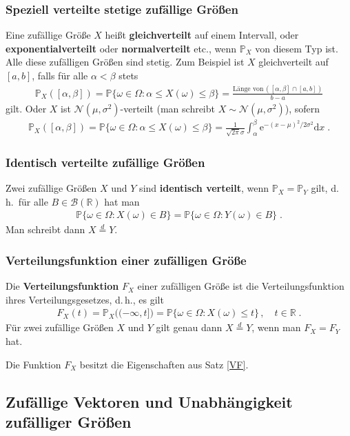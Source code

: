 \documentclass[ngerman,draft,parskip=half,twoside]{scrartcl}
\newcommand*{\R}{\mathbb{R}}      %
\newcommand*{\BorelM}{\mathcal{B}}  %
\newcommand*{\WKM}{\mathbb{P}}      %
\begin{document}
\subsubsection{Speziell verteilte stetige zufällige Größen}
Eine zufällige Größe $X$ heißt \textbf{gleichverteilt} auf einem Intervall,
oder \textbf{exponentialverteilt} oder \textbf{normalverteilt} etc., wenn $\WKM_X$ von diesem Typ
ist.
Alle diese zufälligen Größen sind stetig.
Zum Beispiel ist $X$ gleichverteilt auf $[a,b]$, falls für alle $\alpha<\beta$
stets
\begin{gather*}
  \WKM_X([\alpha,\beta])=\WKM\{\omega\in \Omega \colon \alpha\le X(\omega)\le \beta\}
     =\frac{\mbox{Länge von}\, ([\alpha,\beta]\cap[a,b])}{b-a}
\end{gather*}
gilt. Oder $X$ ist $\mathcal N(\mu,\sigma^2)$-verteilt (man schreibt $X\sim \mathcal N(\mu,\sigma^2)$),
sofern
\begin{gather*}
  \WKM_X([\alpha,\beta])=\WKM\{\omega\in \Omega \colon \alpha\le X(\omega)\le \beta\}=
     \frac{1}{\sqrt{2\pi}\sigma}\int_\alpha^\beta \mathrm e^{-(x-\mu)^2/2\sigma^2}\mathrm d x\;.
\end{gather*}
\subsubsection{Identisch verteilte zufällige Größen}
Zwei zufällige Größen $X$ und $Y$ sind \textbf{identisch verteilt}, wenn $\WKM_X=\WKM_Y$ gilt,
d.\,h.~für alle $B\in\BorelM(\R)$ hat man
\begin{gather*}
  \WKM\{\omega\in \Omega \colon X(\omega)\in B\}= \WKM\{\omega\in \Omega \colon Y(\omega)\in B\}\;.
\end{gather*}
Man schreibt dann $X\stackrel{d}{=}Y$.
\subsubsection{Verteilungsfunktion einer zufälligen Größe}
Die \textbf{Verteilungsfunktion} $F_X$ einer zufälligen Größe ist die Verteilungsfunktion
ihres Verteilungsgesetzes, d.\,h., es gilt
\begin{gather*}
  F_X(t)=\WKM_X\big((-\infty,t]\big)=\WKM\{\omega\in\Omega \colon X(\omega)\le t\}\,,\quad t\in \R\;.
\end{gather*}
Für zwei zufällige Größen $X$ und $Y$ gilt genau dann $X\stackrel{d}{=}Y$, wenn man
$F_X=F_Y$ hat.

Die Funktion $F_X$ besitzt die Eigenschaften aus Satz \ref{VF}.

\subsection{Zufällige Vektoren und Unabhängigkeit zufälliger Größen}
\end{document}
